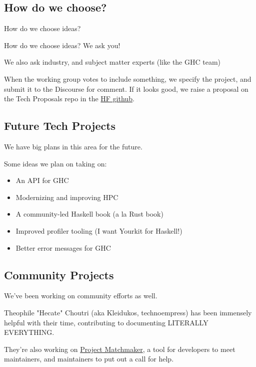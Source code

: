 \documentclass[tikz]{beamer}
\theoremstyle{definition}
\begin{document}
\subsection{How do we choose?}

\frame
{ 
	How do we choose ideas?
}

\frame
{ 
	How do we choose ideas? We ask you!
} 

\frame
{ 
	We also ask industry, and subject matter experts (like the GHC team)
} 

\frame
{ 
	When the working group votes to include something, we specify the project, and submit it to the Discourse for comment. If it looks good, we raise a proposal on the Tech Proposals repo in the \href{https://github.com/haskellfoundation}{HF github}. 
	
}

\subsection{Future Tech Projects}
\frame
{ 
	We have big plans in this area for the future. 
	
}

\frame
{ 
	Some ideas we plan on taking on: 
	
	\begin{itemize}
		\item An API for GHC
		\item Modernizing and improving HPC
		\item A community-led Haskell book (a la Rust book)
		\item Improved profiler tooling (I want Yourkit for Haskell!)
		\item Better error messages for GHC
	\end{itemize}
	
}

\subsection{Community Projects}
\frame
{ 
	We've been working on community efforts as well. 
}

\frame
{ 
	Theophile "Hecate" Choutri (aka Kleidukos, technoempress) has been immensely helpful with their time,
	contributing to documenting LITERALLY EVERYTHING.
}

\frame
{ 
	They're also working on \href{https://github.com/haskellfoundation/matchmaker}{Project Matchmaker}, a tool for developers to meet maintainers, and maintainers
	to put out a call for help. 
} 
\end{document}
